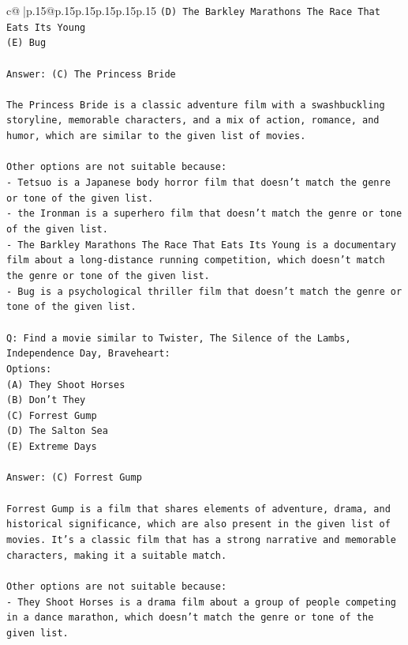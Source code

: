 \documentclass{article}
\begin{document}
{\begin{supertabular}{c@{$\;$}|p{.15\linewidth}@{}p{.15\linewidth}p{.15\linewidth}p{.15\linewidth}p{.15\linewidth}p{.15\linewidth}}
{{{\texttt{(D) The Barkley Marathons The Race That Eats Its Young} \\
\texttt{(E) Bug} \\
\\ 
\texttt{Answer: (C) The Princess Bride} \\
\\ 
\texttt{The Princess Bride is a classic adventure film with a swashbuckling storyline, memorable characters, and a mix of action, romance, and humor, which are similar to the given list of movies.} \\
\\ 
\texttt{Other options are not suitable because:} \\
\texttt{{-} Tetsuo is a Japanese body horror film that doesn't match the genre or tone of the given list.} \\
\texttt{{-} the Ironman is a superhero film that doesn't match the genre or tone of the given list.} \\
\texttt{{-} The Barkley Marathons The Race That Eats Its Young is a documentary film about a long{-}distance running competition, which doesn't match the genre or tone of the given list.} \\
\texttt{{-} Bug is a psychological thriller film that doesn't match the genre or tone of the given list.} \\
\\ 
\texttt{Q: Find a movie similar to Twister, The Silence of the Lambs, Independence Day, Braveheart:} \\
\texttt{Options:} \\
\texttt{(A) They Shoot Horses} \\
\texttt{(B) Don't They} \\
\texttt{(C) Forrest Gump} \\
\texttt{(D) The Salton Sea} \\
\texttt{(E) Extreme Days} \\
\\ 
\texttt{Answer: (C) Forrest Gump} \\
\\ 
\texttt{Forrest Gump is a film that shares elements of adventure, drama, and historical significance, which are also present in the given list of movies. It's a classic film that has a strong narrative and memorable characters, making it a suitable match.} \\
\\ 
\texttt{Other options are not suitable because:} \\
\texttt{{-} They Shoot Horses is a drama film about a group of people competing in a dance marathon, which doesn't match the genre or tone of the given list.} \\
}}}
\end{supertabular}}
\end{document}
